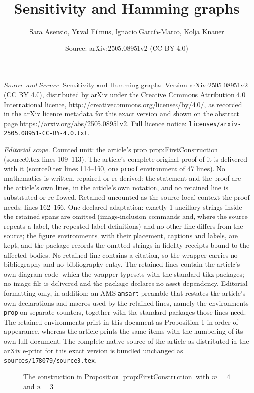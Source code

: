 \documentclass[10pt,a4paper]{amsart}
\title{Sensitivity and Hamming graphs}
\author{Sara Asensio, Yuval Filmus, Ignacio Garc\'ia-Marco, Kolja Knauer}
\date{Source: arXiv:2505.08951v2 (CC BY 4.0)}
\begin{document}
\maketitle

\noindent\emph{Source and licence.} Sensitivity and Hamming graphs. Version arXiv:2505.08951v2 (CC BY 4.0), distributed by arXiv under the Creative Commons Attribution 4.0 International licence, http://creativecommons.org/licenses/by/4.0/, as recorded in the arXiv licence metadata for this exact version and shown on the abstract page https://arxiv.org/abs/2505.08951v2. Full licence notice: \texttt{licenses/arxiv-2505.08951-CC-BY-4.0.txt}.\par\smallskip

\noindent\textit{Editorial scope.} Counted unit: the article's prop prop:FirstConstruction (source0.tex lines 109--113). The article's complete original proof of it is delivered with it (source0.tex lines 114--160, one \texttt{proof} environment of 47 lines). No mathematics is written, repaired or re-derived: the statement and the proof are the article's own lines, in the article's own notation, and no retained line is substituted or re-flowed.  Retained uncounted as the source-local context the proof needs: lines 162--166.  One declared adaptation: exactly 1 ancillary strings inside the retained spans are omitted (image-inclusion commands and, where the source repeats a label, the repeated label definitions) and no other line differs from the source; the figure environments, with their placement, captions and labels, are kept, and the package records the omitted strings in fidelity receipts bound to the affected bodies.  No retained line contains a citation, so the wrapper carries no bibliography and no bibliography entry.  The retained lines contain the article's own diagram code, which the wrapper typesets with the standard tikz packages; no image file is delivered and the package declares no asset dependency.  Editorial formatting only, in addition: an AMS \texttt{amsart} preamble that restates the article's own declarations and macros used by the retained lines, namely the environments \texttt{prop} on separate counters, together with the standard packages those lines need.  The retained environments print in this document as Proposition 1 in order of appearance, whereas the article prints the same items with the numbering of its own full document.  The complete native source of the article as distributed in the arXiv e-print for this exact version is bundled unchanged as \texttt{sources/178079/source0.tex}.
 \begin{figure}[!ht]
 \centering
 	\caption{The construction in Proposition \ref{prop:FirstConstruction} with $m=4$ and $n=3$} 
 	\label{fig:counterexample3}
 \end{figure}
\end{document}
